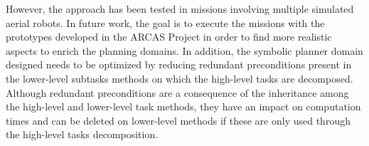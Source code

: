 \documentclass[letterpaper, 10 pt, conference]{ieeeconf}  %
\begin{document}
However, the approach has been tested in missions involving multiple simulated aerial robots. In future work, the goal is to execute the missions with the prototypes developed in the ARCAS Project in order to find more realistic aspects to enrich the planning domains. In addition, the symbolic planner domain designed needs to be optimized by reducing redundant preconditions present in the lower-level subtasks methods on which the high-level tasks are decomposed. Although redundant preconditions are a consequence of the inheritance among the high-level and lower-level task methods, they have an impact on computation times and can be deleted on lower-level methods if these are only used through the high-level tasks decomposition.




\end{document}

